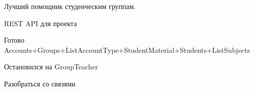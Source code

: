Лучший помощник студенческим группам.

R\+E\+ST A\+PI для проекта


Готово Accounts+\+Groups+\+List\+Account\+Type+\+Student\+Material+\+Students+\+List\+Subjects

Остановился на Group\+Teacher

Разобраться со связями 